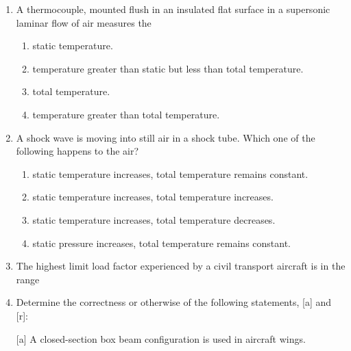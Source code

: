 \documentclass[journal,12pt,onecolumn]{IEEEtran}
\theoremstyle{remark}
\begin{document}
\begin{enumerate}
    \item A thermocouple, mounted flush in an insulated flat surface in a supersonic laminar flow of air measures the
    \hfill{}

    \begin{enumerate}
        \item static temperature.
        \item temperature greater than static but less than total temperature.
        \item total temperature.
        \item temperature greater than total temperature.
    \end{enumerate}

    \item A shock wave is moving into still air in a shock tube. Which one of the following happens to the air?
    \hfill{}

    \begin{enumerate}
        \item static temperature increases, total temperature remains constant.
        \item static temperature increases, total temperature increases.
        \item static temperature increases, total temperature decreases.
        \item static pressure increases, total temperature remains constant.
    \end{enumerate}

    \item The highest limit load factor experienced by a civil transport aircraft is in the range
    \hfill{}

    \begin{enumerate}
    \end{enumerate}

    \item Determine the correctness or otherwise of the following statements, [a] and [r]:
    
    [a] A closed-section box beam configuration is used in aircraft wings.
    

\end{enumerate}
\end{document}
